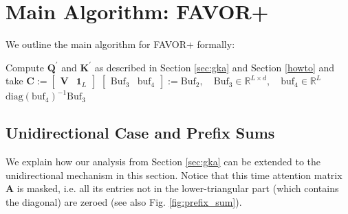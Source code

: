\newpage

\section{Main Algorithm: FAVOR+}
\label{appendix:main_algorithm}
We outline the main algorithm for FAVOR+ formally: 

\begin{algorithm}[h]
\SetAlgoLined
{}
Compute $\mathbf{Q}^{\prime}$ and $\mathbf{K}^{\prime}$ as described in Section \ref{sec:gka} and Section \ref{howto} and take $\mathbf{C} := \begin{bmatrix} \mathbf{V} & \mathbf{1}_L \end{bmatrix}$\;
$\begin{bmatrix} \mathrm{Buf}_3 & \mathrm{buf}_4 \end{bmatrix} := \mathrm{Buf}_2, \quad \mathrm{Buf}_3 \in \mathbb{R}^{L \times d}, \quad \mathrm{buf}_4 \in \mathbb{R}^L$\;
\Return $\mathrm{diag} (\mathrm{buf}_4)^{-1} \mathrm{Buf}_3$\;
\caption{FAVOR+ (bidirectional or unidirectional).}
\label{alg:1}
\end{algorithm}

\subsection{Unidirectional Case and Prefix Sums}
\label{subsec:unidirectional}
We explain how our analysis from Section \ref{sec:gka} can be extended to the unidirectional mechanism in this section.
Notice that this time attention matrix $\mathbf{A}$ is masked, i.e. all its entries not in the lower-triangular part (which contains the diagonal) are zeroed (see also Fig. \ref{fig:prefix_sum}).


